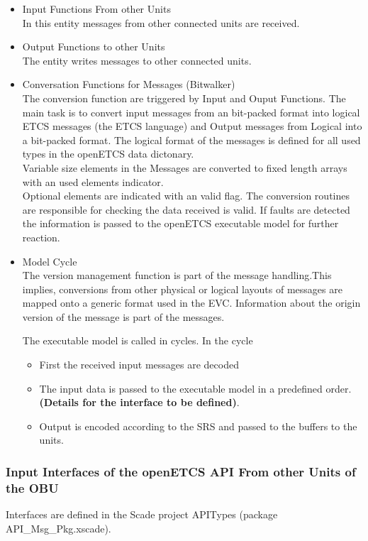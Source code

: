 \documentclass{template/openetcs_report}
\begin{document}
\begin{itemize}
\item Input Functions From other Units\\
In this entity messages from other connected units are received.
\item Output Functions to other Units\\
The entity writes messages to other connected units.
\item Conversation Functions for Messages (Bitwalker)\\
The conversion function are triggered by Input and Ouput Functions. The main task is to convert input messages from an bit-packed format into logical ETCS messages (the ETCS language) and Output messages from Logical into a bit-packed format. The logical format of the messages is defined for all used types in the openETCS data dictonary. \\
Variable size elements in the Messages are converted to fixed length arrays with an used elements indicator.\\
Optional elements are indicated with an valid flag.
The conversion routines are responsible for checking the data received is valid. If  faults are detected the information is passed to the openETCS executable model for further reaction. 
\item Model Cycle\\

The version management function is part of the message handling.This implies, conversions from other physical or logical layouts of messages are mapped onto a generic format used in the EVC. Information about the origin version of the message is part of the messages.
 
The executable model is called in cycles. In the cycle 
\begin{itemize}
\item First the received input messages are decoded
\item The input data is passed to the executable model in a predefined order. \textbf{(Details for the interface to be defined)}.
\item Output is encoded according to the \gls{SRS} and passed to the  buffers to the units.
\end{itemize}
\end{itemize}


\subsubsection{Input Interfaces of the openETCS API From other Units of the OBU}
Interfaces are defined in the Scade project APITypes (package API\_Msg\_Pkg.xscade).
\end{document}
